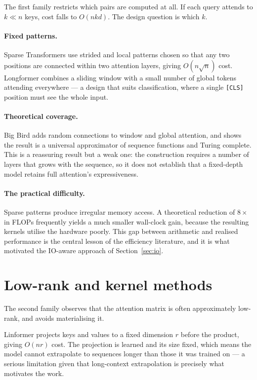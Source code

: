 \documentclass[11pt,a4paper]{article}
\begin{document}
The first family restricts which pairs are computed at all. If each query
attends to $k \ll n$ keys, cost falls to $O(nkd)$. The design question is
which $k$.

\paragraph{Fixed patterns.}
Sparse Transformers \cite{child2019} use strided and local patterns chosen so
that any two positions are connected within two attention layers, giving
$O(n\sqrt{n})$ cost. Longformer \cite{beltagy2020} combines a sliding window
with a small number of global tokens attending everywhere --- a design that
suits classification, where a single \texttt{[CLS]} position must see the whole
input.

\paragraph{Theoretical coverage.}
Big Bird \cite{zaheer2020} adds random connections to window and global
attention, and shows the result is a universal approximator of sequence
functions and Turing complete. This is a reassuring result but a weak one: the
construction requires a number of layers that grows with the sequence, so it
does not establish that a fixed-depth model retains full attention's
expressiveness.

\paragraph{The practical difficulty.}
Sparse patterns produce irregular memory access. A theoretical reduction of
$8\times$ in FLOPs frequently yields a much smaller wall-clock gain, because
the resulting kernels utilise the hardware poorly. This gap between arithmetic
and realised performance is the central lesson of the efficiency literature,
and it is what motivated the IO-aware approach of Section~\ref{sec:io}.

\section{Low-rank and kernel methods}
\label{sec:lowrank}

The second family observes that the attention matrix is often approximately
low-rank, and avoids materialising it.

Linformer \cite{wang2020} projects keys and values to a fixed dimension $r$
before the product, giving $O(nr)$ cost. The projection is learned and its
size fixed, which means the model cannot extrapolate to sequences longer than
those it was trained on --- a serious limitation given that long-context
extrapolation is precisely what motivates the work.
\end{document}
